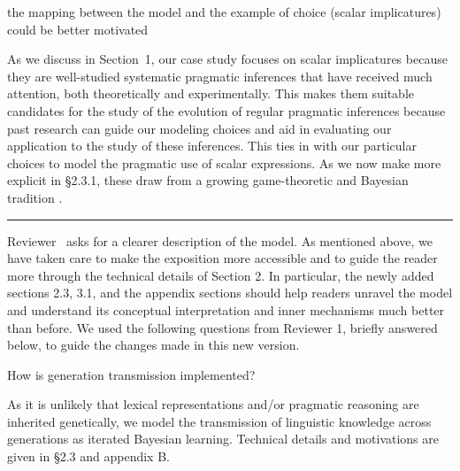 \documentclass[12pt,a4paper]{article}
\begin{document}
\begin{mdframed}[backgroundcolor=gray!25,linecolor=gray!25,frametitle= Reviewer \thereviewerCounter~comment \thereviewerCommentCounter \hfill ~~({\it modeling choices})]
the mapping between the model and the example of choice (scalar implicatures) could be better motivated
\end{mdframed}

As we discuss in Section~1, our case study focuses on scalar implicatures because they are
well-studied systematic pragmatic inferences that have received much attention, both
theoretically and experimentally. This makes them suitable candidates for the study of the
evolution of regular pragmatic inferences because past research can guide our modeling choices and aid
in evaluating our application to the study of these inferences. This ties in with our
particular choices to model the pragmatic use of scalar expressions. As we now make more
explicit in \S 2.3.1, these draw from a growing game-theoretic and Bayesian tradition
\citep[e.g.,][]{franke:2009,FrankeJager2015:Probabilistic-p,GoodmanFrank2016:Pragmatic-Langu}.

%
\vspace{.75cm}
\noindent\rule{\textwidth}{1pt}
\vspace{.1cm}

\noindent Reviewer \thereviewerCounter~asks for a clearer description of the model. As mentioned above, we have taken care to make the exposition more accessible and to guide the reader more
through the technical details of Section 2. In particular, the newly added sections 2.3, 3.1,
and the appendix sections should help readers unravel the model and understand its conceptual
interpretation and inner mechanisms much better than before. We used the following questions
from Reviewer 1, briefly answered below, to guide the changes made in this new version.

\vspace{.5cm}
\begin{mdframed}[backgroundcolor=gray!25,linecolor=gray!25]
How is generation transmission implemented?
\end{mdframed}
As it is unlikely that lexical representations and/or pragmatic reasoning are inherited
genetically, we model the transmission of linguistic knowledge across generations as  iterated
Bayesian learning. Technical details and motivations are given in \S 2.3 and appendix B.
\end{document}
